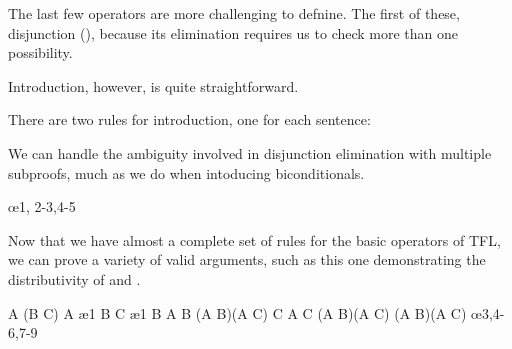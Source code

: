 The last few operators are more challenging to defnine. The first of these,
disjunction (\eor), because its elimination requires us to check more than one
possibility.

Introduction, however, is quite straightforward.

\begin{fitchrule}
  \label{def:eor-introduction-rule}
  \leavevmode
  There are two rules for \eor introduction, one for each sentence: \\
\end{fitchrule}

We can handle the ambiguity involved in disjunction elimination with multiple
subproofs, much as we do when intoducing biconditionals.

\begin{fitchrule}
  \label{def:eor-elimination-rule}
  \leavevmode
  \vspace{-0.9\baselineskip}
  \begin{fitchproof}
     {\ephi\eor\epsi}
    \open
     {\ephi}  
     {\echi}
    \close
    \open
     {\epsi}  
     {\echi}
    \close
     {\echi}  \oe{1, 2-3,4-5}
  \end{fitchproof}
\end{fitchrule}

Now that we have almost a complete set of rules for the basic operators of TFL,
we can prove a variety of valid arguments, such as this one demonstrating the
distributivity of \eand and \eor.

\begin{fitchproof}
   {A \eand (B \eor C)}          
   {A}                           \ae{1}
   {B \eor C}                    \ae{1}
  \open
   {B}                           
   {A \eand B}                   
   {(A \eand B)\eor(A \eand C)}  
    \close
  \open
   {C}                           
   {A \eand C}                   
   {(A \eand B)\eor(A \eand C)}  
  \close
   {(A \eand B)\eor(A \eand C)} \oe{3,4-6,7-9}
\end{fitchproof}

